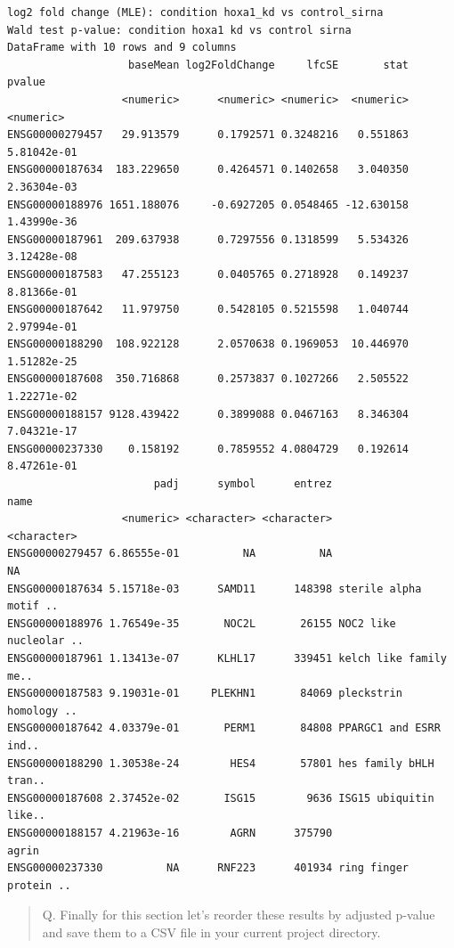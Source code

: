 \documentclass[
  letterpaper,
  DIV=11,
  numbers=noendperiod]{scrartcl}
\newenvironment{Shaded}{\begin{snugshade}}{\end{snugshade}}
\newcommand{\AttributeTok}[1]{\textcolor[rgb]{0.40,0.45,0.13}{#1}}
\newcommand{\FunctionTok}[1]{\textcolor[rgb]{0.28,0.35,0.67}{#1}}
\newcommand{\NormalTok}[1]{\textcolor[rgb]{0.00,0.23,0.31}{#1}}
\newcommand{\OtherTok}[1]{\textcolor[rgb]{0.00,0.23,0.31}{#1}}
\newcommand{\SpecialCharTok}[1]{\textcolor[rgb]{0.37,0.37,0.37}{#1}}
\newcommand{\StringTok}[1]{\textcolor[rgb]{0.13,0.47,0.30}{#1}}
\begin{document}
\begin{verbatim}
log2 fold change (MLE): condition hoxa1_kd vs control_sirna 
Wald test p-value: condition hoxa1 kd vs control sirna 
DataFrame with 10 rows and 9 columns
                   baseMean log2FoldChange     lfcSE       stat      pvalue
                  <numeric>      <numeric> <numeric>  <numeric>   <numeric>
ENSG00000279457   29.913579      0.1792571 0.3248216   0.551863 5.81042e-01
ENSG00000187634  183.229650      0.4264571 0.1402658   3.040350 2.36304e-03
ENSG00000188976 1651.188076     -0.6927205 0.0548465 -12.630158 1.43990e-36
ENSG00000187961  209.637938      0.7297556 0.1318599   5.534326 3.12428e-08
ENSG00000187583   47.255123      0.0405765 0.2718928   0.149237 8.81366e-01
ENSG00000187642   11.979750      0.5428105 0.5215598   1.040744 2.97994e-01
ENSG00000188290  108.922128      2.0570638 0.1969053  10.446970 1.51282e-25
ENSG00000187608  350.716868      0.2573837 0.1027266   2.505522 1.22271e-02
ENSG00000188157 9128.439422      0.3899088 0.0467163   8.346304 7.04321e-17
ENSG00000237330    0.158192      0.7859552 4.0804729   0.192614 8.47261e-01
                       padj      symbol      entrez                   name
                  <numeric> <character> <character>            <character>
ENSG00000279457 6.86555e-01          NA          NA                     NA
ENSG00000187634 5.15718e-03      SAMD11      148398 sterile alpha motif ..
ENSG00000188976 1.76549e-35       NOC2L       26155 NOC2 like nucleolar ..
ENSG00000187961 1.13413e-07      KLHL17      339451 kelch like family me..
ENSG00000187583 9.19031e-01     PLEKHN1       84069 pleckstrin homology ..
ENSG00000187642 4.03379e-01       PERM1       84808 PPARGC1 and ESRR ind..
ENSG00000188290 1.30538e-24        HES4       57801 hes family bHLH tran..
ENSG00000187608 2.37452e-02       ISG15        9636 ISG15 ubiquitin like..
ENSG00000188157 4.21963e-16        AGRN      375790                  agrin
ENSG00000237330          NA      RNF223      401934 ring finger protein ..
\end{verbatim}

\begin{quote}
Q. Finally for this section let's reorder these results by adjusted
p-value and save them to a CSV file in your current project directory.
\end{quote}

\begin{Shaded}
\end{Shaded}
\end{document}
